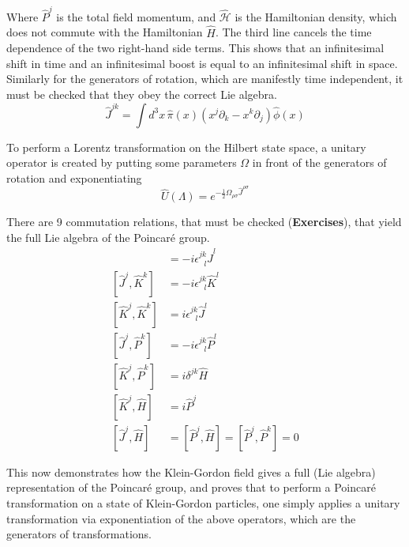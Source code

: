 \noindent Where $\hat{P}^j$ is the total field momentum, and $\hat{\mathscr{H}}$ is the Hamiltonian density, which does not commute with the Hamiltonian $\hat{H}$. The third line cancels the time dependence of the two right-hand side terms. This shows that an infinitesimal shift in time and an infinitesimal boost is equal to an infinitesimal shift in space. \\

\noindent Similarly for the generators of rotation, which are manifestly time independent, it must be checked that they obey the correct Lie algebra. 
\begin{equation}
\hat{J}^{jk} = \int d^3 x \, \hat{\pi}(x)(x^j \partial_k - x^k \partial_j) \hat{\phi}(x)
\end{equation}

\noindent To perform a Lorentz transformation on the Hilbert state space, a unitary operator is created by putting some parameters $\Omega$ in front of the generators of rotation and exponentiating
\begin{equation}
\hat{U}(\Lambda) = e^{-\frac{1}{2} \Omega_{\rho\sigma} \hat{J}^{\rho\sigma}}
\end{equation}

\noindent There are 9 commutation relations, that must be checked (\textbf{Exercises}), that yield the full Lie algebra of the Poincar\'e group.
\begin{align}
[\hat{J}^j, \hat{J}^k] &= -i \epsilon^{jk}_{\,\,\,\,l} \hat{J}^l \\
[\hat{J}^j, \hat{K}^k] &= -i \epsilon^{jk}_{\,\,\,\,l} \hat{K}^l \\
[\hat{K}^j, \hat{K}^k] &= i \epsilon^{jk}_{\,\,\,\,l} \hat{J}^l \\
[\hat{J}^j, \hat{P}^k] &= -i \epsilon^{jk}_{\,\,\,\,l} \hat{P}^l \\
[\hat{K}^j, \hat{P}^k] &= i \delta^{jk} \hat{H} \\
[\hat{K}^j, \hat{H}] &= i \hat{P}^j \\
[\hat{J}^j, \hat{H}] &=  [\hat{P}^j, \hat{H}] = [\hat{P}^j, \hat{P}^k] = 0
\end{align}

\noindent This now demonstrates how the Klein-Gordon field gives a full (Lie algebra) representation of the Poincar\'e group, and  proves that to perform a Poincar\'e transformation on a state of Klein-Gordon particles, one simply applies a unitary transformation via exponentiation of the above operators, which are the generators of transformations.